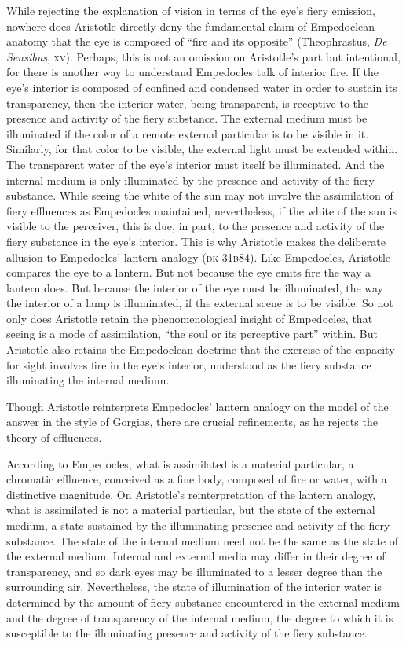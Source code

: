 While rejecting the explanation of vision in terms of the eye's fiery emission, nowhere does Aristotle directly deny the fundamental claim of Empedoclean a\-nat\-o\-my that the eye is composed of ``fire and its opposite'' (Theophrastus, \emph{De Sensibus}, \textsc{xv}). Perhaps, this is not an omission on Aristotle's part but intentional, for there is another way to understand Empedocles talk of interior fire. If the eye's interior is composed of confined and condensed water in order to sustain its transparency, then the interior water, being transparent, is receptive to the presence and activity of the fiery substance. The external medium must be illuminated if the color of a remote external particular is to be visible in it. Similarly, for that color to be visible, the external light must be extended within. The transparent water of the eye's interior must itself be illuminated. And the internal medium is only illuminated by the presence and activity of the fiery substance. While seeing the white of the sun may not involve the assimilation of fiery effluences as Empedocles maintained, nevertheless, if the white of the sun is visible to the perceiver, this is due, in part, to the presence and activity of the fiery substance in the eye's interior. This is why Aristotle makes the deliberate allusion to Empedocles' lantern analogy (\textsc{dk} 31\textsc{b}84). Like Empedocles, Aristotle compares the eye to a lantern. But not because the eye emits fire the way a lantern does. But because the interior of the eye must be illuminated, the way the interior of a lamp is illuminated, if the external scene is to be visible. So not only does Aristotle retain the phenomenological insight of Empedocles, that seeing is a mode of assimilation, ``the soul or its perceptive part'' within. But Aristotle also retains the Empedoclean doctrine that the exercise of the capacity for sight involves fire in the eye's interior, understood as the fiery substance illuminating the internal medium. 

Though Aristotle reinterprets Empedocles' lantern analogy on the model of the answer in the style of Gorgias, there are crucial refinements, as he rejects the theory of effluences. 

According to Empedocles, what is assimilated is a material particular, a chromatic effluence, conceived as a fine body, composed of fire or water, with a distinctive magnitude. On Aristotle's reinterpretation of the lantern analogy, what is assimilated is not a material particular, but the state of the external medium, a state sustained by the illuminating presence and activity of the fiery substance. The state of the internal medium need not be the same as the state of the external medium. Internal and external media may differ in their degree of transparency, and so dark eyes may be illuminated to a lesser degree than the surrounding air. Nevertheless, the state of illumination of the interior water is determined by the amount of fiery substance encountered in the external medium and the degree of transparency of the internal medium, the degree to which it is susceptible to the illuminating presence and activity of the fiery substance. 

